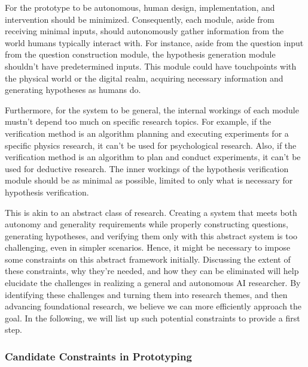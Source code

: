 For the prototype to be autonomous, human design, implementation, and intervention should be minimized. Consequently, each module, aside from receiving minimal inputs, should autonomously gather information from the world humans typically interact with. For instance, aside from the question input from the question construction module, the hypothesis generation module shouldn't have predetermined inputs. This module could have touchpoints with the physical world or the digital realm, acquiring necessary information and generating hypotheses as humans do.

Furthermore, for the system to be general, the internal workings of each module mustn't depend too much on specific research topics. For example, if the verification method is an algorithm planning and executing experiments for a specific physics research, it can't be used for psychological research. Also, if the verification method is an algorithm to plan and conduct experiments, it can't be used for deductive research. The inner workings of the hypothesis verification module should be as minimal as possible, limited to only what is necessary for hypothesis verification. 

This is akin to an abstract class of research. Creating a system that meets both autonomy and generality requirements while properly constructing questions, generating hypotheses, and verifying them only with this abstract system is too challenging, even in simpler scenarios. Hence, it might be necessary to impose some constraints on this abstract framework initially. Discussing the extent of these constraints, why they're needed, and how they can be eliminated will help elucidate the challenges in realizing a general and  autonomous AI researcher. By identifying these challenges and turning them into research themes, and then advancing foundational research, we believe we can more efficiently approach the goal. In the following, we will list up such potential constraints to provide a first step.

\subsubsection{Candidate Constraints in Prototyping}

